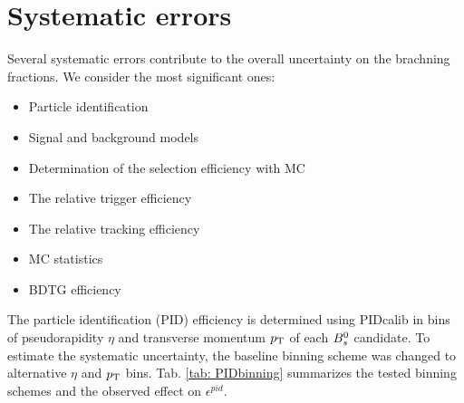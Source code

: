 \section{Systematic errors}
\label{sec: systematics}

Several systematic errors contribute to the overall uncertainty on the brachning fractions. We consider the most significant ones:

\begin{itemize}

\item Particle identification

\item Signal and background models

\item Determination of the selection efficiency with MC

\item The relative trigger efficiency

\item The relative tracking efficiency

\item MC statistics

\item BDTG efficiency

\end{itemize} 

The particle identification (PID) efficiency is determined using PIDcalib in bins of pseudorapidity $\eta$ and transverse momentum $\mbox{$p_{\mathrm{ T}}$}$ of each ${{B}^0_{s}}$ candidate. 
To estimate the systematic uncertainty, the baseline binning scheme was changed to alternative $\eta$ and $\mbox{$p_{\mathrm{ T}}$}$ bins. 
Tab. \ref{tab: PIDbinning} summarizes the tested binning schemes and the observed effect on $\epsilon^{pid}$. 

